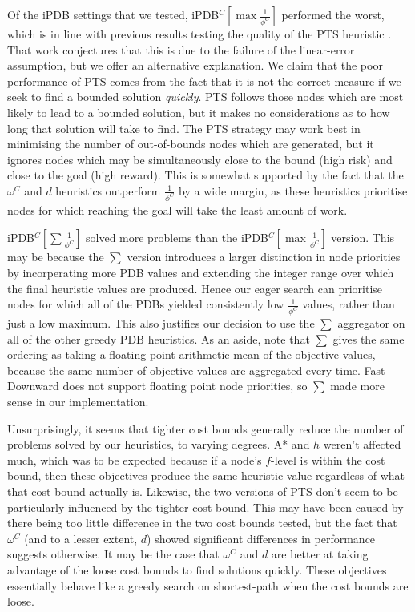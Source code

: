 \documentclass[letterpaper]{article} %
\begin{document}
Of the iPDB settings that we tested, iPDB\(^C[\max \frac{1}{\phi^C}]\) performed the worst,
which is in line with previous results testing the quality of the PTS heuristic \cite{haslum2013heuristics}.
That work conjectures that this is due to the failure of the linear-error
assumption, but we offer an alternative explanation.
We claim that the poor performance of PTS comes from the fact that it is
not the correct measure if we seek to find a bounded solution \textit{quickly}.
PTS follows those nodes which are most likely to lead to a bounded solution,
but it makes no considerations as to how long that solution will take to find.
The PTS strategy may work best in minimising the number of out-of-bounds nodes
which are generated, but it ignores nodes
which may be simultaneously close to the bound (high risk) and close to the goal (high reward).
This is somewhat supported by the fact that the \(\omega^C\) and \(d\) heuristics outperform
\(\frac{1}{\phi^C}\) by a wide margin,
as these heuristics prioritise nodes for which reaching
the goal will take the least amount of work.

iPDB\(^C[\sum \frac{1}{\phi^C}]\) solved more problems than the iPDB\(^C[\max \frac{1}{\phi^C}]\) version.
This may be because the \(\sum\) version introduces a larger distinction
in node priorities by incorperating more PDB values and extending the integer range over which the final heuristic values are produced. Hence our eager search can prioritise nodes
for which all of the PDBs yielded consistently low \(\frac{1}{\phi^C}\) values, rather than
just a low maximum. This also justifies our decision
to use the \(\sum\) aggregator on all of the other greedy PDB heuristics.
As an aside, note that \(\sum\) gives the same ordering as
taking a floating point arithmetic mean of the objective values,
because the same number of objective values are aggregated every time.
Fast Downward does not support floating point node priorities, so \(\sum\)
made more sense in our implementation.

Unsurprisingly, it seems that tighter cost bounds generally reduce the number of problems solved by our heuristics,
to varying degrees. A* and \(h\) weren't affected much,
which was to be expected because if a node's \(f\)-level is within the cost bound,
then these objectives produce the same heuristic value regardless of what that cost bound actually is.
Likewise, the two versions of PTS don't seem to be particularly influenced
by the tighter cost bound. This may have been caused by there being
too little difference in the two cost bounds tested,
but the fact that \(\omega^C\) (and to a lesser extent, \(d\))
showed significant differences in performance suggests otherwise.
It may be the case that \(\omega^C\) and \(d\) are better
at taking advantage of the loose cost bounds to find solutions
quickly. These objectives essentially behave like a greedy search
on shortest-path when the cost bounds are loose.
\end{document}
